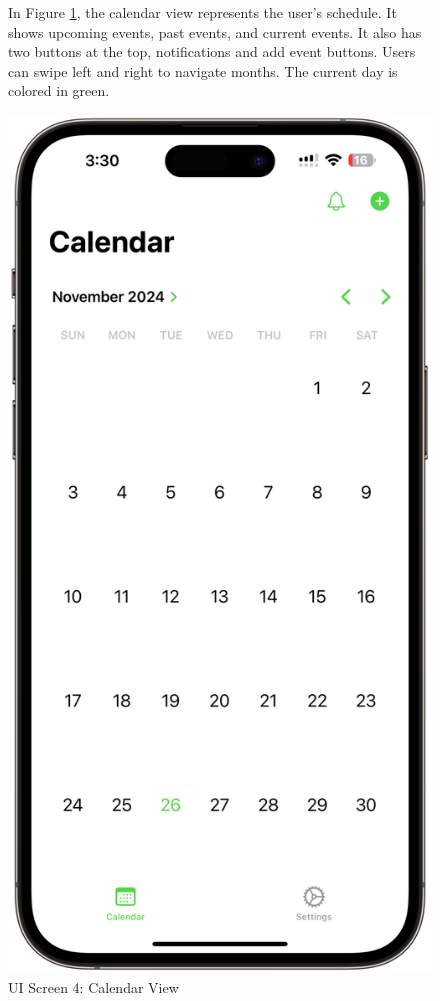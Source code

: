 \begin{figure}[!h]
    \begin{minipage}{0.65\textwidth}
        In Figure \ref{fig:ui-screen-4}, the calendar view represents the user's schedule. It shows upcoming events, past events, and current events. It also has two buttons at the top, notifications and add event buttons. Users can swipe left and right to navigate months. The current day is colored in green.
    \end{minipage}
    \hfill
    \begin{minipage}{0.3\textwidth}
        \centering
        \includegraphics[width=\textwidth]{images/screen4.png}
        \caption{UI Screen 4: Calendar View}
        \label{fig:ui-screen-4}
    \end{minipage}
\end{figure}

